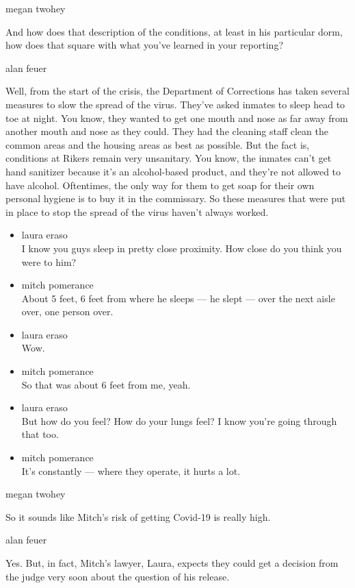 megan twohey

And how does that description of the conditions, at least in his
particular dorm, how does that square with what you've learned in your
reporting?

alan feuer

Well, from the start of the crisis, the Department of Corrections has
taken several measures to slow the spread of the virus. They've asked
inmates to sleep head to toe at night. You know, they wanted to get one
mouth and nose as far away from another mouth and nose as they could.
They had the cleaning staff clean the common areas and the housing areas
as best as possible. But the fact is, conditions at Rikers remain very
unsanitary. You know, the inmates can't get hand sanitizer because it's
an alcohol-based product, and they're not allowed to have alcohol.
Oftentimes, the only way for them to get soap for their own personal
hygiene is to buy it in the commissary. So these measures that were put
in place to stop the spread of the virus haven't always worked.

\begin{itemize}
\item
  laura eraso\\
  I know you guys sleep in pretty close proximity. How close do you
  think you were to him?
\item
  mitch pomerance\\
  About 5 feet, 6 feet from where he sleeps --- he slept --- over the
  next aisle over, one person over.
\item
  laura eraso\\
  Wow.
\item
  mitch pomerance\\
  So that was about 6 feet from me, yeah.
\item
  laura eraso\\
  But how do you feel? How do your lungs feel? I know you're going
  through that too.
\item
  mitch pomerance\\
  It's constantly --- where they operate, it hurts a lot.
\end{itemize}

megan twohey

So it sounds like Mitch's risk of getting Covid-19 is really high.

alan feuer

Yes. But, in fact, Mitch's lawyer, Laura, expects they could get a
decision from the judge very soon about the question of his release.

